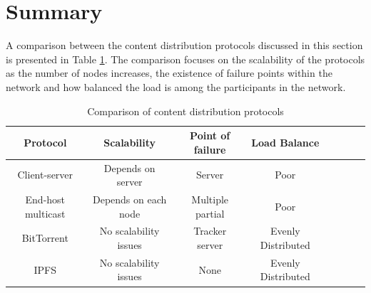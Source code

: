 {\section{Summary}{

A comparison between the content distribution protocols discussed in this section is presented in Table \ref{tab:CNComp}. The comparison focuses on the scalability of the protocols as the number of nodes increases, the existence of failure points within the network and how balanced the load is among the participants in the network.

\begin {table}[htb!]
\caption {Comparison of content distribution protocols} \label{tab:CNComp} 
\begin{center}
 \begin{tabular}{|c| c|c| c|c| c|c| c|} 
 \hline
  Protocol & Scalability & Point of failure & Load Balance \\ [0.5ex] 
 \hline
 Client-server & Depends on server & Server & Poor  \\ 
 \hline
 End-host multicast  & Depends on each node & Multiple partial & Poor \\
 \hline
 BitTorrent  & No scalability issues & Tracker server & Evenly Distributed \\
 \hline
 IPFS  & No scalability issues & None & Evenly Distributed \\
 \hline
\end{tabular}
\end{center}
\end {table}

}

}